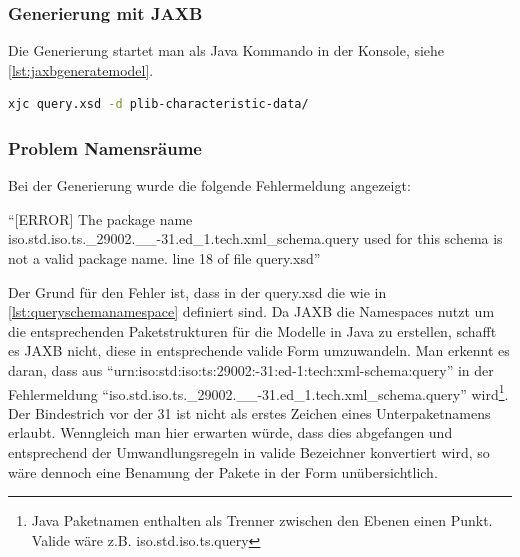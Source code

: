 \subsubsection{Generierung mit JAXB}

Die Generierung startet man als Java Kommando in der Konsole, siehe \autoref{lst:jaxbgeneratemodel}.

\begin{lstlisting}[caption=JAXB Modellgenerierung von der Konsole, language=sh, label=lst:jaxbgeneratemodel]
xjc query.xsd -d plib-characteristic-data/ 
\end{lstlisting}

\subsubsection{Problem Namensräume}
Bei der Generierung wurde die folgende Fehlermeldung angezeigt:

\enquote{[ERROR] The package name iso.std.iso.ts.\_29002.\_\_-31.ed\_1.tech.xml\_schema.query used for this schema is not a valid package name. line 18 of file query.xsd}
  
Der Grund für den Fehler ist, dass in der query.xsd die  wie in  \autoref{lst:queryschemanamespace} definiert sind. Da JAXB die \Glspl{Namespace} nutzt um die entsprechenden Paketstrukturen für die Modelle in Java zu erstellen, schafft es JAXB nicht, diese in entsprechende valide Form umzuwandeln. Man erkennt es daran, dass aus \enquote{urn:iso:std:iso:ts:29002:-31:ed-1:tech:xml-schema:query} in der Fehlermeldung \enquote{iso.std.iso.ts.\_29002.\_\_-31.ed\_1.tech.xml\_schema.query} wird\footnote{Java Paketnamen enthalten als Trenner zwischen den Ebenen einen Punkt. Valide wäre z.B. iso.std.iso.ts.query}. Der Bindestrich vor der 31 ist nicht als erstes Zeichen eines  Unterpaketnamens erlaubt. Wenngleich man hier erwarten würde, dass dies abgefangen und entsprechend der Umwandlungsregeln in valide Bezeichner konvertiert wird, so wäre dennoch eine Benamung der Pakete in der Form unübersichtlich.  



